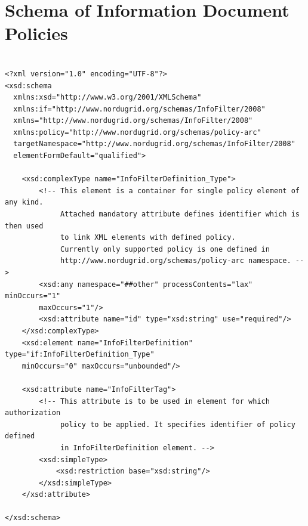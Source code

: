 \documentclass{book}
\begin{document}
\section{Schema of Information Document Policies}
\label{annex:info_policies_schema}
\begin{verbatim}

<?xml version="1.0" encoding="UTF-8"?>
<xsd:schema
  xmlns:xsd="http://www.w3.org/2001/XMLSchema"
  xmlns:if="http://www.nordugrid.org/schemas/InfoFilter/2008"
  xmlns="http://www.nordugrid.org/schemas/InfoFilter/2008"
  xmlns:policy="http://www.nordugrid.org/schemas/policy-arc"
  targetNamespace="http://www.nordugrid.org/schemas/InfoFilter/2008"
  elementFormDefault="qualified">

    <xsd:complexType name="InfoFilterDefinition_Type">
        <!-- This element is a container for single policy element of any kind.
             Attached mandatory attribute defines identifier which is then used
             to link XML elements with defined policy.
             Currently only supported policy is one defined in
             http://www.nordugrid.org/schemas/policy-arc namespace. -->
        <xsd:any namespace="##other" processContents="lax" minOccurs="1" 
        maxOccurs="1"/>
        <xsd:attribute name="id" type="xsd:string" use="required"/>
    </xsd:complexType>
    <xsd:element name="InfoFilterDefinition" type="if:InfoFilterDefinition_Type" 
    minOccurs="0" maxOccurs="unbounded"/>

    <xsd:attribute name="InfoFilterTag">
        <!-- This attribute is to be used in element for which authorization
             policy to be applied. It specifies identifier of policy defined
             in InfoFilterDefinition element. -->
        <xsd:simpleType>
            <xsd:restriction base="xsd:string"/>
        </xsd:simpleType>
    </xsd:attribute>

</xsd:schema>

\end{verbatim}

\end{document}
